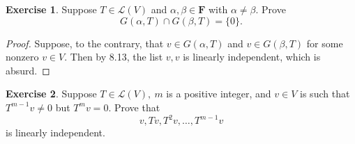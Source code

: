 \documentclass{article}
\theoremstyle{definition}
\newtheorem{ex}{Exercise}
\begin{document}
\begin{ex}
  Suppose $T \in \mathcal{L}(V)$ and $\alpha, \beta \in \mathbf{F}$ with $\alpha \neq \beta$. Prove $$G(\alpha, T) \cap G(\beta, T) = \lbrace 0 \rbrace.$$
\end{ex}
\begin{proof}
  Suppose, to the contrary, that $v \in G(\alpha, T)$ and $v \in G(\beta, T)$ for some nonzero $v \in V$. Then by 8.13, the list $v, v$ is linearly independent, which is absurd.
\end{proof}

\begin{ex}
  Suppose $T \in \mathcal{L}(V),\ m$ is a positive integer, and $v \in V$ is such that $T^{m-1}v \neq 0$ but $T^m v = 0$. Prove that
  $$v, Tv, T^2v, \dots, T^{m-1}v$$
  is linearly independent.
\end{ex}
\end{document}

